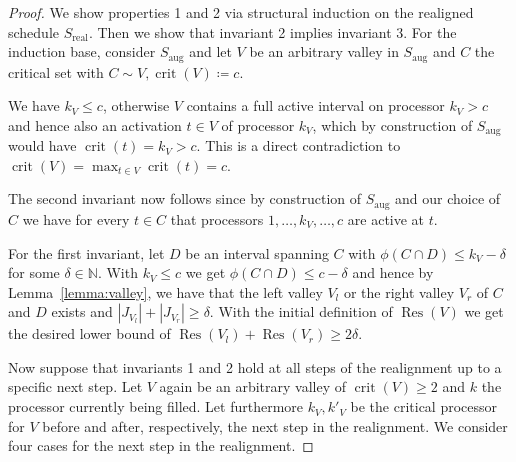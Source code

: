 \documentclass[a4paper]{article}
\DeclareMathOperator{\aug}{aug}
\DeclareMathOperator{\real}{real}
\DeclareMathOperator{\crit}{crit}
\DeclareMathOperator{\res}{Res}
\begin{document}
\begin{proof}
  We show properties 1 and 2 via structural induction on the realigned schedule $S_{\real}$.
  Then we show that invariant 2 implies invariant 3.
  For the induction base, consider $S_{\aug}$ and let $V$ be an arbitrary valley in $S_{\aug}$ and $C$ the critical set with $C \sim V, \crit(V) \coloneqq c$.

  We have $k_V \leq c$, otherwise $V$ contains a full active interval on processor $k_V > c$ and hence also an activation $t \in V$ of processor $k_V$, which by construction of $S_{\aug}$ would have $\crit(t) = k_V > c$. This is a direct contradiction to $\crit(V) = \max_{t \in V} \crit(t) = c$.

  The second invariant now follows since by construction of $S_{\aug}$ and our choice of $C$ we have for every $t \in C$ that processors $1, \ldots, k_V, \ldots, c$ are active at $t$.

  For the first invariant, let $D$ be an interval spanning $C$ with $\phi(C \cap D) \leq k_V - \delta$ for some $\delta \in \mathbb{N}$.
  With $k_V \leq c$ we get $\phi(C \cap D) \leq c - \delta$ and hence by Lemma~\ref{lemma:valley}, we have that the left valley $V_l$ or the right valley $V_r$ of $C$ and $D$ exists and $|J_{V_l}| + |J_{V_r}| \geq \delta$.
  With the initial definition of $\res(V)$ we get the desired lower bound of $\res(V_l) + \res(V_r) \geq 2 \delta$.

  Now suppose that invariants 1 and 2 hold at all steps of the realignment up to a specific next step.
  Let $V$ again be an arbitrary valley of $\crit(V) \geq 2$ and $k$ the processor currently being filled.
  Let furthermore $k_V, k'_V$ be the critical processor for $V$ before and after, respectively, the next step in the realignment.
  We consider four cases for the next step in the realignment.


\end{proof}
\end{document}

